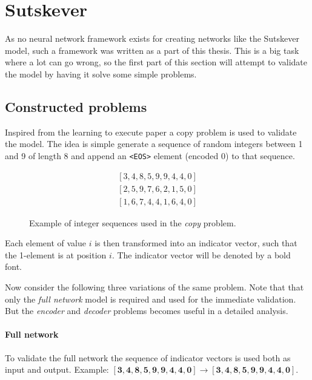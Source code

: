 \section{Sutskever}

As no neural network framework exists for creating networks like the Sutskever model, such a framework was written as a part of this thesis. This is a big task where a lot can go wrong, so the first part of this section will attempt to validate the model by having it solve some simple problems.

\subsection{Constructed problems}

Inspired from the learning to execute paper \cite{learning-to-execute} a copy problem is used to validate the model. The idea is simple generate a sequence of random integers between 1 and 9 of length 8 and append an \texttt{<EOS>} element (encoded 0) to that sequence. 
\begin{figure}[H]
\begin{equation*}
\begin{aligned}
[3, 4, 8, 5, 9, 9, 4, 4, 0] \\
[2, 5, 9, 7, 6, 2, 1, 5, 0] \\
[1, 6, 7, 4, 4, 1, 6, 4, 0]
\end{aligned}
\end{equation*}
\caption{Example of integer sequences used in the \textit{copy} problem.}
\end{figure}

Each element of value $i$ is then transformed into an indicator vector, such that the 1-element is at position $i$. The indicator vector will be denoted by a bold font.

Now consider the following three variations of the same problem. Note that that only the \textit{full network} model is required and used for the immediate validation. But the \textit{encoder} and \textit{decoder} problems becomes useful in a detailed analysis.

\paragraph{Full network} To validate the full network the sequence of indicator vectors is used both as input and output. Example: $[\mathbf{3}, \mathbf{4}, \mathbf{8}, \mathbf{5}, \mathbf{9}, \mathbf{9}, \mathbf{4}, \mathbf{4}, \mathbf{0}] \rightarrow [\mathbf{3}, \mathbf{4}, \mathbf{8}, \mathbf{5}, \mathbf{9}, \mathbf{9}, \mathbf{4}, \mathbf{4}, \mathbf{0}]$.

